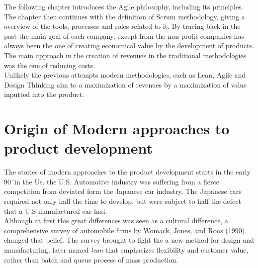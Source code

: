 \documentclass[../main.tex]{subfiles}
\begin{document}
The following chapter introduces the Agile philosophy, including its principles. The chapter then continues with the definition of Scrum methodology, giving a overview of the tools, processes and roles related to it. 
By tracing back in the past the main goal of each company, except from the non-profit companies has always been the one of creating economical value by the development of products. The main approach in the creation of revenues in the traditional methodologies was the one of reducing costs.\\
Unlikely the previous attempts modern methodologies, such as Lean, Agile and Design Thinking aim to a maximization of revenues by a maximization of value inputted into the product.\\
\section{Origin of Modern approaches to product development}
The stories of modern approaches to the product development starts in the early 90´in the Us. the U.S. Automotive industry was suffering from a fierce competition from deviated form the Japanese car industry. The Japanese cars required not only half the time to develop, but were subject to half the defect that a U.S manufactured car had.\\
Although at first this great differences was seen as a cultural difference, a comprehensive survey of automobile firms by Womack, Jones, and Roos (1990) changed that belief. The survey brought to light the a new method for design and manufacturing, later named \textit{lean} that emphasizes flexibility and customer value, rather than batch and queue process of mass production. 
\cleardoublepage
\end{document}
